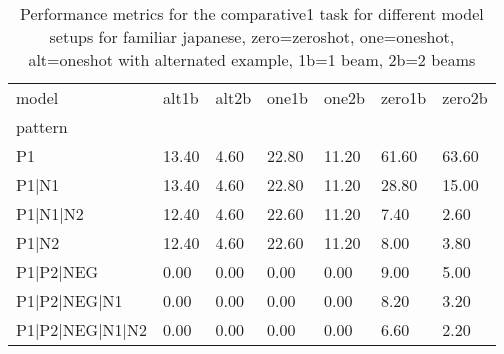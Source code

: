 \begin{table}[h]
\begin{tabular}{l|llllll}
\toprule
model & alt1b & alt2b & one1b & one2b & zero1b & zero2b \\
pattern &  &  &  &  &  &  \\
\midrule
P1 & 13.40 & 4.60 & 22.80 & 11.20 & 61.60 & 63.60 \\
P1|N1 & 13.40 & 4.60 & 22.80 & 11.20 & 28.80 & 15.00 \\
P1|N1|N2 & 12.40 & 4.60 & 22.60 & 11.20 & 7.40 & 2.60 \\
P1|N2 & 12.40 & 4.60 & 22.60 & 11.20 & 8.00 & 3.80 \\
P1|P2|NEG & 0.00 & 0.00 & 0.00 & 0.00 & 9.00 & 5.00 \\
P1|P2|NEG|N1 & 0.00 & 0.00 & 0.00 & 0.00 & 8.20 & 3.20 \\
P1|P2|NEG|N1|N2 & 0.00 & 0.00 & 0.00 & 0.00 & 6.60 & 2.20 \\
\bottomrule
\end{tabular}
\caption{Performance metrics for the comparative1 task for different model setups for familiar japanese, zero=zeroshot, one=oneshot, alt=oneshot with alternated example, 1b=1 beam, 2b=2 beams}
\label{tab:ja fam_comparative1_performance}
\end{table}
